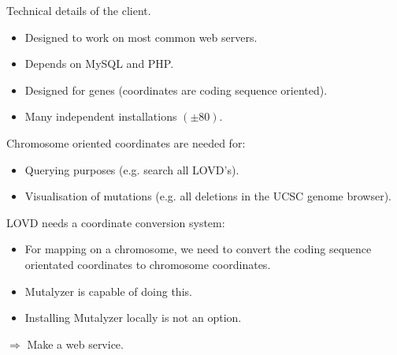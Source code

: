\documentclass[a4, portrait]{seminar}
\begin{document}
\begin{slide}
Technical details of the client.

\vspace*{1cm}
\begin{itemize}
\item Designed to work on most common web servers.
\item Depends on MySQL and PHP.
\item Designed for genes (coordinates are coding sequence oriented).
\item Many independent installations $(\pm 80)$.
\end{itemize}

Chromosome oriented coordinates are needed for:
\begin{itemize}
\item Querying purposes (e.g. search all LOVD's).
\item Visualisation of mutations (e.g. all deletions in the UCSC genome 
      browser).
\end{itemize}
\vfill
\end{slide}

\begin{slide}
LOVD needs a coordinate conversion system:

\vspace*{1cm}
\begin{itemize}
\item For mapping on a chromosome, we need to convert the coding sequence
      orientated coordinates to chromosome coordinates.
\item Mutalyzer is capable of doing this.
\item Installing Mutalyzer locally is not an option.
\end{itemize}

\vspace*{1cm}
$\Rightarrow$ Make a web service.
\vfill
\end{slide}
\end{document}
